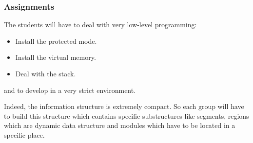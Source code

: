 \begin{frame}
  \frametitle{Assignments}

  The students will have to deal with very low-level programming:

  \begin{itemize}[<+->]
    \item
      Install the protected mode.
    \item
      Install the virtual memory.
    \item
      Deal with the stack.
  \end{itemize}

  and to develop in a very strict environment.

  \nl

  Indeed, the information structure is extremely compact. So each group
  will have to build this structure which contains specific substructures
  like segments, regions which are dynamic data structure and modules
  which have to be located in a specific place.
\end{frame}


